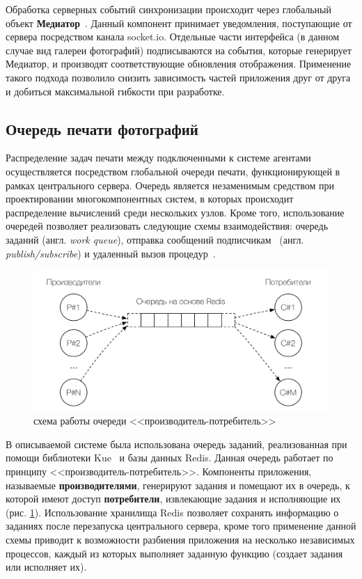 \documentclass[a4paper,14pt,href,draft]{article}
\begin{document}
Обработка серверных событий синхронизации происходит через глобальный объект \textbf{Медиатор}~\cite{MediatorPattern}.
Данный компонент принимает уведомления, поступающие от сервера посредством канала socket.io. Отдельные части интерфейса
(в данном случае вид галереи фотографий) подписываются на события, которые генерирует Медиатор, и производят
соответствующие обновления отображения. Применение такого подхода позволило снизить зависимость частей приложения друг
от друга и добиться максимальной гибкости при разработке.

\subsection{Очередь печати фотографий}
Распределение задач печати между подключенными к системе агентами осуществляется посредством глобальной очереди печати,
функционирующей в рамках центрального сервера. Очередь является незаменимым средством при проектировании многокомпонентных
систем, в которых происходит распределение вычислений среди нескольких узлов. Кроме того, использование очередей позволяет
реализовать следующие схемы взаимодействия: очередь заданий (англ. \textit{work queue}), отправка сообщений
подписчикам~\cite{RabbitMQ} (англ. \textit{publish/subscribe}) и удаленный вызов про\-це\-дур~\cite{DistributiveSystems}.


\begin{figure}[htbp]
\begin{center}
  \includegraphics[scale=0.75]{producer-consumer.pdf}
    \caption{схема работы очереди <<производитель-потребитель>>}
    \label{fig:ProducerConsumer}
\end{center}
\end{figure}


В описываемой системе была использована очередь заданий, реализованная при помощи библиотеки Kue~\cite{Kue} и базы данных
Redis. Данная очередь работает по принципу <<производитель-потребитель>>. Компоненты приложения, называемые
\textbf{производителями}, генерируют задания и помещают их в очередь, к которой имеют доступ \textbf{потребители},
извлекающие задания и исполняющие их (рис. \ref{fig:ProducerConsumer}). Использование хранилища Redis позволяет
сохранять информацию о заданиях после перезапуска центрального сервера, кроме того применение данной схемы приводит к
возможности разбиения приложения на несколько независимых процессов, каждый из которых выполняет заданную функцию
(создает задания или исполняет их).
\end{document}
